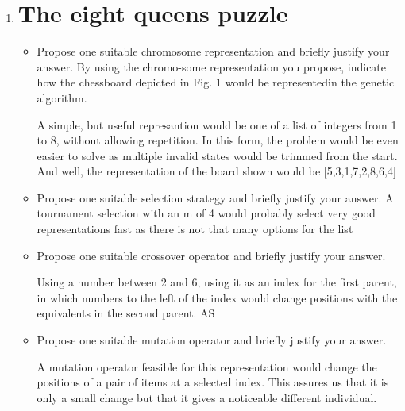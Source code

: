 \documentclass{article}
\begin{document}
\begin{enumerate}
    \item \section*{The eight queens puzzle}
    \begin{itemize}
        \item Propose one suitable chromosome representation and briefly justify your answer.  By using the chromo-some representation you propose, indicate how the chessboard depicted in Fig. 1 would be representedin the genetic algorithm.
        
        A simple, but useful represantion would be one of a list of integers from 1 to 8, without allowing repetition. In this form, the problem would be even easier to solve as multiple invalid states would be trimmed from the start. And well, the representation of the board shown would be [5,3,1,7,2,8,6,4]
        
        \item Propose one suitable selection strategy and briefly justify your answer.
        A tournament selection with an m of 4 would probably select very good representations fast as there is not that many options for the list 

        \item Propose one suitable crossover operator and briefly justify your answer.
        
        Using a number between 2 and 6, using it as an index for the first parent, in which numbers to the left of the index would change positions with the equivalents in the second parent. AS

        \item Propose one suitable mutation operator and briefly justify your answer.
        
        A mutation operator feasible for this representation would change the positions of a pair of items at a selected index. This assures us that it is only a small change but that it gives a noticeable different individual.



\end{itemize}
\end{enumerate}
\end{document}
